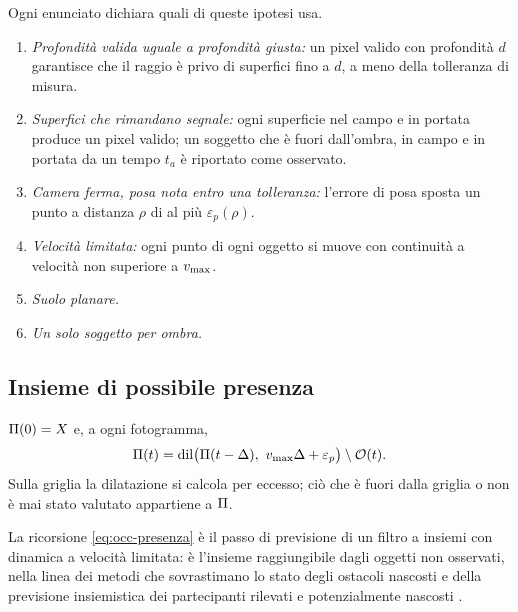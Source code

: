 \begin{ipotesi}[Modello]\label{ip:occ-modello}
Ogni enunciato dichiara quali di queste ipotesi usa.
\begin{enumerate}[label=(\roman*),itemsep=0pt]
\item \emph{Profondità valida uguale a profondità giusta:} un pixel valido con profondità $d$ garantisce che il raggio è privo di superfici fino a $d$, a meno della tolleranza di misura.
\item \emph{Superfici che rimandano segnale:} ogni superficie nel campo e in portata produce un pixel valido; un soggetto che è fuori dall'ombra, in campo e in portata da un tempo $t_a$ è riportato come osservato.
\item \emph{Camera ferma, posa nota entro una tolleranza:} l'errore di posa sposta un punto a distanza $\rho$ di al più $\varepsilon_p(\rho)$.
\item \emph{Velocità limitata:} ogni punto di ogni oggetto si muove con continuità a velocità non superiore a $v_{\max}$.
\item \emph{Suolo planare.}
\item \emph{Un solo soggetto per ombra.}
\end{enumerate}
\end{ipotesi}

\subsection{Insieme di possibile presenza}\label{sec:occ-presenza}

\begin{definizione}\label{def:occ-presenza}
$\Pi(0)=X$ e, a ogni fotogramma,
\begin{equation}\label{eq:occ-presenza}
\Pres(t)=\dilata\bigl(\Pres(t-\Delta),\ \vmax\Delta+\varepsilon_p\bigr)\setminus\Oss(t).
\end{equation}
Sulla griglia la dilatazione si calcola per eccesso; ciò che è fuori dalla griglia o non è mai stato valutato appartiene a $\Pi$.
\end{definizione}

La ricorsione \eqref{eq:occ-presenza} è il passo di previsione di un filtro a insiemi con dinamica a velocità limitata: è l'insieme raggiungibile dagli oggetti non osservati, nella linea dei metodi che sovrastimano lo stato degli ostacoli nascosti \cite{orzechowski2018} e della previsione insiemistica dei partecipanti rilevati e potenzialmente nascosti \cite{koschi2021}.

